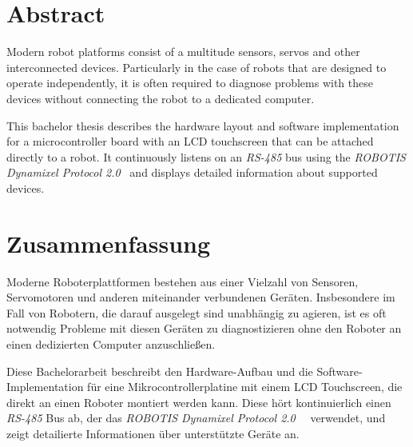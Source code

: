 \section*{Abstract}
\label{abstract}

Modern robot platforms consist of a multitude sensors, servos and other interconnected devices.
Particularly in the case of robots that are designed to operate independently, it is often required
to diagnose problems with these devices without connecting the robot to a dedicated computer.

This bachelor thesis describes the hardware layout and software implementation for a microcontroller
board with an LCD touchscreen that can be attached directly to a robot. It continuously listens on
an \textit{RS-485} bus using the \textit{ROBOTIS Dynamixel Protocol 2.0}~\cite{dynamixel-protocol-2}
and displays detailed information about supported devices.

\vfill
\section*{Zusammenfassung}
\label{zusammenfassung}

Moderne Roboterplattformen bestehen aus einer Vielzahl von Sensoren, Servomotoren und anderen
miteinander verbundenen Geräten. Insbesondere im Fall von Robotern, die darauf ausgelegt sind
unabhängig zu agieren, ist es oft notwendig Probleme mit diesen Geräten zu diagnostizieren ohne den
Roboter an einen dedizierten Computer anzuschließen.

Diese Bachelorarbeit beschreibt den Hardware-Aufbau und die Software-Implementation für eine
Mikrocontrollerplatine mit einem LCD Touchscreen, die direkt an einen Roboter montiert werden kann.
Diese hört kontinuierlich einen \textit{RS-485} Bus ab, der das \textit{ROBOTIS Dynamixel Protocol 2.0}~\
\cite{dynamixel-protocol-2} verwendet, und zeigt detailierte Informationen über unterstützte Geräte an.
